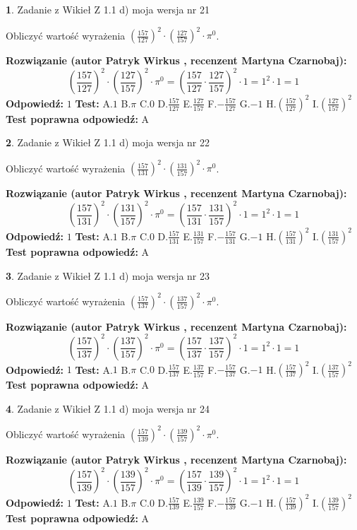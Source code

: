 \documentclass[12pt, a4paper]{article}
\theoremstyle{definition} %
\newtheorem{zad}{}
\newcommand{\zadStart}[1]{\begin{zad}#1\newline}
\newcommand{\zadStop}{\end{zad}}
\newcommand{\rozwStart}[2]{\noindent \textbf{Rozwiązanie (autor #1 , recenzent #2): }\newline}
\newcommand{\rozwStop}{\newline}
\newcommand{\odpStart}{\noindent \textbf{Odpowiedź:}\newline}
\newcommand{\odpStop}{\newline}
\newcommand{\testStart}{\noindent \textbf{Test:}\newline}
\newcommand{\testStop}{\newline}
\newcommand{\kluczStart}{\noindent \textbf{Test poprawna odpowiedź:}\newline}
\newcommand{\kluczStop}{\newline}
\begin{document}
\zadStart{Zadanie z Wikieł Z 1.1 d) moja wersja nr 21}

Obliczyć wartość wyrażenia $(\frac{157}{127})^{2} \cdot (\frac{127}{157})^{2} \cdot \pi^{0}$.
\zadStop
\rozwStart{Patryk Wirkus}{Martyna Czarnobaj}
$$(\frac{157}{127})^{2} \cdot (\frac{127}{157})^{2} \cdot \pi^{0} = (\frac{157}{127} \cdot \frac{127}{157})^{2} \cdot 1 = 1^{2} \cdot 1 = 1$$
\rozwStop
\odpStart
$1$
\odpStop
\testStart
A.$1$ B.$\pi$ C.$0$ D.$\frac{157}{127}$ E.$\frac{127}{157}$
F.$-\frac{157}{127}$ G.$-1$
H.$(\frac{157}{127})^{2}$
I.$(\frac{127}{157})^{2}$
\testStop
\kluczStart
A
\kluczStop



\zadStart{Zadanie z Wikieł Z 1.1 d) moja wersja nr 22}

Obliczyć wartość wyrażenia $(\frac{157}{131})^{2} \cdot (\frac{131}{157})^{2} \cdot \pi^{0}$.
\zadStop
\rozwStart{Patryk Wirkus}{Martyna Czarnobaj}
$$(\frac{157}{131})^{2} \cdot (\frac{131}{157})^{2} \cdot \pi^{0} = (\frac{157}{131} \cdot \frac{131}{157})^{2} \cdot 1 = 1^{2} \cdot 1 = 1$$
\rozwStop
\odpStart
$1$
\odpStop
\testStart
A.$1$ B.$\pi$ C.$0$ D.$\frac{157}{131}$ E.$\frac{131}{157}$
F.$-\frac{157}{131}$ G.$-1$
H.$(\frac{157}{131})^{2}$
I.$(\frac{131}{157})^{2}$
\testStop
\kluczStart
A
\kluczStop



\zadStart{Zadanie z Wikieł Z 1.1 d) moja wersja nr 23}

Obliczyć wartość wyrażenia $(\frac{157}{137})^{2} \cdot (\frac{137}{157})^{2} \cdot \pi^{0}$.
\zadStop
\rozwStart{Patryk Wirkus}{Martyna Czarnobaj}
$$(\frac{157}{137})^{2} \cdot (\frac{137}{157})^{2} \cdot \pi^{0} = (\frac{157}{137} \cdot \frac{137}{157})^{2} \cdot 1 = 1^{2} \cdot 1 = 1$$
\rozwStop
\odpStart
$1$
\odpStop
\testStart
A.$1$ B.$\pi$ C.$0$ D.$\frac{157}{137}$ E.$\frac{137}{157}$
F.$-\frac{157}{137}$ G.$-1$
H.$(\frac{157}{137})^{2}$
I.$(\frac{137}{157})^{2}$
\testStop
\kluczStart
A
\kluczStop



\zadStart{Zadanie z Wikieł Z 1.1 d) moja wersja nr 24}

Obliczyć wartość wyrażenia $(\frac{157}{139})^{2} \cdot (\frac{139}{157})^{2} \cdot \pi^{0}$.
\zadStop
\rozwStart{Patryk Wirkus}{Martyna Czarnobaj}
$$(\frac{157}{139})^{2} \cdot (\frac{139}{157})^{2} \cdot \pi^{0} = (\frac{157}{139} \cdot \frac{139}{157})^{2} \cdot 1 = 1^{2} \cdot 1 = 1$$
\rozwStop
\odpStart
$1$
\odpStop
\testStart
A.$1$ B.$\pi$ C.$0$ D.$\frac{157}{139}$ E.$\frac{139}{157}$
F.$-\frac{157}{139}$ G.$-1$
H.$(\frac{157}{139})^{2}$
I.$(\frac{139}{157})^{2}$
\testStop
\kluczStart
A
\kluczStop
\end{document}
